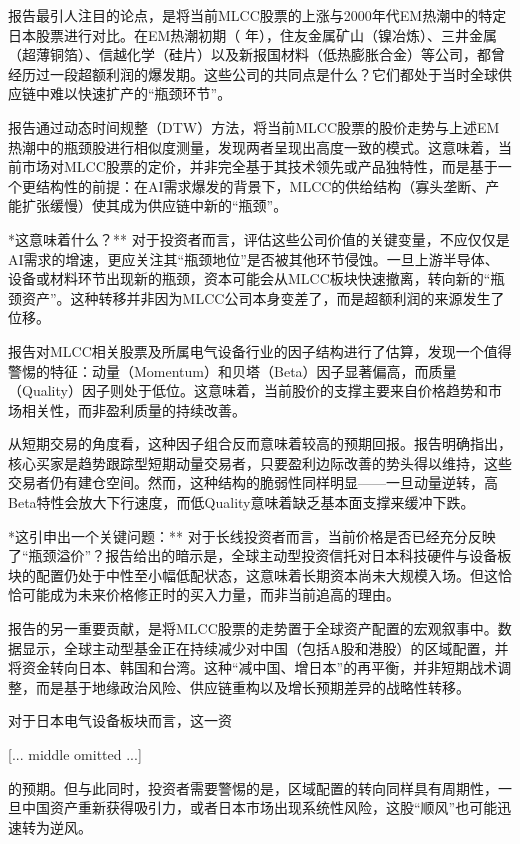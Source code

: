 \documentclass[11pt]{ctexart}
\begin{document}
报告最引人注目的论点，是将当前MLCC股票的上涨与2000年代EM热潮中的特定日本股票进行对比。在EM热潮初期（ 年），住友金属矿山（镍冶炼）、三井金属（超薄铜箔）、信越化学（硅片）以及新报国材料（低热膨胀合金）等公司，都曾经历过一段超额利润的爆发期。这些公司的共同点是什么？它们都处于当时全球供应链中难以快速扩产的“瓶颈环节”。

报告通过动态时间规整（DTW）方法，将当前MLCC股票的股价走势与上述EM热潮中的瓶颈股进行相似度测量，发现两者呈现出高度一致的模式。这意味着，当前市场对MLCC股票的定价，并非完全基于其技术领先或产品独特性，而是基于一个更结构性的前提：在AI需求爆发的背景下，MLCC的供给结构（寡头垄断、产能扩张缓慢）使其成为供应链中新的“瓶颈”。

*这意味着什么？** 对于投资者而言，评估这些公司价值的关键变量，不应仅仅是AI需求的增速，更应关注其“瓶颈地位”是否被其他环节侵蚀。一旦上游半导体、设备或材料环节出现新的瓶颈，资本可能会从MLCC板块快速撤离，转向新的“瓶颈资产”。这种转移并非因为MLCC公司本身变差了，而是超额利润的来源发生了位移。

报告对MLCC相关股票及所属电气设备行业的因子结构进行了估算，发现一个值得警惕的特征：动量（Momentum）和贝塔（Beta）因子显著偏高，而质量（Quality）因子则处于低位。这意味着，当前股价的支撑主要来自价格趋势和市场相关性，而非盈利质量的持续改善。

从短期交易的角度看，这种因子组合反而意味着较高的预期回报。报告明确指出，核心买家是趋势跟踪型短期动量交易者，只要盈利边际改善的势头得以维持，这些交易者仍有建仓空间。然而，这种结构的脆弱性同样明显——一旦动量逆转，高Beta特性会放大下行速度，而低Quality意味着缺乏基本面支撑来缓冲下跌。

*这引申出一个关键问题：** 对于长线投资者而言，当前价格是否已经充分反映了“瓶颈溢价”？报告给出的暗示是，全球主动型投资信托对日本科技硬件与设备板块的配置仍处于中性至小幅低配状态，这意味着长期资本尚未大规模入场。但这恰恰可能成为未来价格修正时的买入力量，而非当前追高的理由。

报告的另一重要贡献，是将MLCC股票的走势置于全球资产配置的宏观叙事中。数据显示，全球主动型基金正在持续减少对中国（包括A股和港股）的区域配置，并将资金转向日本、韩国和台湾。这种“减中国、增日本”的再平衡，并非短期战术调整，而是基于地缘政治风险、供应链重构以及增长预期差异的战略性转移。

对于日本电气设备板块而言，这一资

[... middle omitted ...]

的预期。但与此同时，投资者需要警惕的是，区域配置的转向同样具有周期性，一旦中国资产重新获得吸引力，或者日本市场出现系统性风险，这股“顺风”也可能迅速转为逆风。
\end{document}
